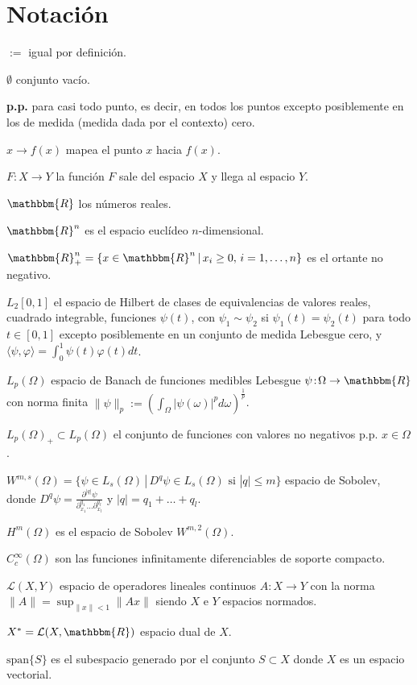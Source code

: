 \documentclass[a4paper,10pt]{book}
\newcommand{\R}{\mathbbm{R}}
\newcommand{\Rn}{\R^n}
\newcommand{\arr}{\rightarrow}
\newcommand{\la}{\langle}
\newcommand{\ra}{\rangle}
\begin{document}
\section*{Notaci\'on}
{\setlength{\parindent}{0cm}
$:=$ igual por definición.

$\emptyset$ conjunto vacío.

\hangindent=1cm \textbf{p.p.} para casi todo punto, es decir, en todos los puntos excepto posiblemente en los de medida (medida dada por el contexto) cero.

$x\to f(x)$ mapea el punto $x$ hacia $f(x)$.

$F:X\arr Y$ la función $F$ sale del espacio $X$ y llega al espacio $Y$.

$\R$ los números reales.

$\Rn$ es el espacio euclídeo $n$-dimensional.

$\Rn_+=\{x\in\Rn\,|\,x_i\geq0,\,i=1,\ldots,n\}$ es el ortante no negativo.

\hangindent=1cm $L_2[0,1]$ el espacio de Hilbert de clases de equivalencias de valores reales, cuadrado integrable, funciones $\psi(t)$, con $\psi_1\sim\psi_2$ si $\psi_1(t)=\psi_2(t)$ para todo $t\in[0,1]$ excepto posiblemente en un conjunto de medida Lebesgue cero, y $\la\psi,\varphi\ra=\int_0^1\psi(t)\varphi(t)dt$.

\hangindent=1cm $L_p(\Omega)$ espacio de Banach de funciones medibles Lebesgue $\psi\!:\!\Omega\arr\R$ con norma finita $\|\psi\|_p\!:=\!(\int_{\Omega}\!|\psi(\omega)|^p d\omega)^{\frac{1}{p}}$.

$L_p(\Omega)_+\subset L_p(\Omega)$ el conjunto de funciones con valores no negativos p.p. $x\in\Omega$.

\hangindent=1cm $W^{m,s}(\Omega)=\{\psi\in L_s(\Omega)\,|\, D^q\psi\in L_s(\Omega)\mbox{ si }|q|\leq m\}$ espacio de Sobolev, donde $D^q\psi=\frac{\partial^{|q|}\psi}{\partial_{x_1}^{q_1}\ldots\partial_{x_l}^{q_l}}$ y $|q|=q_1+\ldots+q_l$.

$H^m(\Omega)$ es el espacio de Sobolev $W^{m,2}(\Omega)$.

$C_c^\infty(\Omega)$ son las funciones infinitamente diferenciables de soporte compacto.

\hangindent=1cm $\mathcal{L}(X,Y)$ espacio de operadores lineales continuos $A:X\arr Y$ con la norma $\|A\|=\sup_{\|x\|<1}\|Ax\|$ siendo $X$ e $Y$ espacios normados.

$X^*=\mathcal{L}(X,\R)$ espacio dual de $X$.

$\mbox{span}\{S\}$ es el subespacio generado por el conjunto $S\subset X$ donde $X$ es un espacio vectorial.

}
\end{document}
